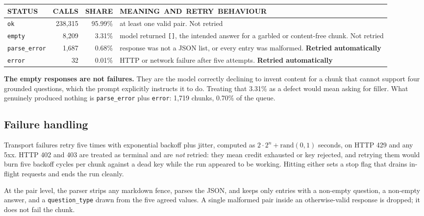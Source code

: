 \documentclass[10pt,a4paper]{article}
\newcommand{\kw}[1]{\textbf{#1}}
\newcommand{\codeid}[1]{\texttt{\footnotesize\color{inksoft}#1}}
\newcommand{\tablehead}[1]{{\uimed\fontsize{6.8}{8}\selectfont\color{crail}\mbox{#1}}}
\begin{document}
\begin{tabularx}{\textwidth}{@{}p{2.9cm}rrL@{}}
\tablehead{STATUS} & \tablehead{CALLS} & \tablehead{SHARE} & \tablehead{MEANING AND RETRY BEHAVIOUR}\\
\midrule
\codeid{ok} & 238,315 & 95.99\% & at least one valid pair. Not retried\\
\codeid{empty} & 8,209 & 3.31\% & model returned \codeid{[]}, the intended
answer for a garbled or content-free chunk. Not retried\\
\codeid{parse\_error} & 1,687 & 0.68\% & response was not a JSON list, or every
entry was malformed. \textbf{Retried automatically}\\
\codeid{error} & 32 & 0.01\% & HTTP or network failure after five attempts.
\textbf{Retried automatically}\\
\bottomrule
\end{tabularx}

\vspace{0.6em}
\kw{The empty responses are not failures.} They are the model correctly
declining to invent content for a chunk that cannot support four grounded
questions, which the prompt explicitly instructs it to do. Treating that 3.31\%
as a defect would mean asking for filler. What genuinely produced nothing is
\codeid{parse\_error} plus \codeid{error}: 1,719 chunks, 0.70\% of the queue.

\subsection{Failure handling}

Transport failures retry five times with exponential backoff plus jitter,
computed as $2 \cdot 2^{n} + \mathrm{rand}(0,1)$ seconds, on HTTP 429 and any
5xx. HTTP 402 and 403 are treated as terminal and are \emph{not} retried: they
mean credit exhausted or key rejected, and retrying them would burn five
backoff cycles per chunk against a dead key while the run appeared to be
working. Hitting either sets a stop flag that drains in-flight requests and
ends the run cleanly.

At the pair level, the parser strips any markdown fence, parses the JSON, and
keeps only entries with a non-empty question, a non-empty answer, and a
\codeid{question\_type} drawn from the five agreed values. A single malformed
pair inside an otherwise-valid response is dropped; it does not fail the chunk.
\end{document}
